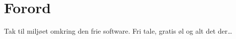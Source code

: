 \chapter{Forord}


Tak til miljøet omkring den frie software. Fri tale, gratis øl og alt
det der\dots {}

